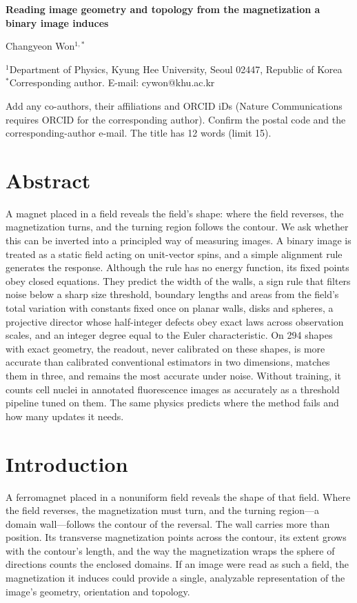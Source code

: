\documentclass[11pt,a4paper]{article}
\begin{document}
\begin{center}
{\LARGE\bfseries Reading image geometry and topology from the magnetization a binary image induces\par}
\vspace{1em}
{\large Changyeon Won$^{1,*}$\par}
\vspace{0.5em}
{\small $^1$Department of Physics, Kyung Hee University, Seoul 02447, Republic of Korea\\
$^*$Corresponding author. E-mail: cywon@khu.ac.kr\par}
\end{center}
\begin{authorbox}
Add any co-authors, their affiliations and ORCID iDs (Nature Communications requires ORCID for the corresponding author). Confirm the postal code and the corresponding-author e-mail. The title has 12 words (limit 15).
\end{authorbox}

\section*{Abstract}
A magnet placed in a field reveals the field's shape: where the field reverses, the magnetization turns, and the turning region follows the contour. We ask whether this can be inverted into a principled way of measuring images. A binary image is treated as a static field acting on unit-vector spins, and a simple alignment rule generates the response. Although the rule has no energy function, its fixed points obey closed equations. They predict the width of the walls, a sign rule that filters noise below a sharp size threshold, boundary lengths and areas from the field's total variation with constants fixed once on planar walls, disks and spheres, a projective director whose half-integer defects obey exact laws across observation scales, and an integer degree equal to the Euler characteristic. On 294 shapes with exact geometry, the readout, never calibrated on these shapes, is more accurate than calibrated conventional estimators in two dimensions, matches them in three, and remains the most accurate under noise. Without training, it counts cell nuclei in annotated fluorescence images as accurately as a threshold pipeline tuned on them. The same physics predicts where the method fails and how many updates it needs.

\section*{Introduction}
A ferromagnet placed in a nonuniform field reveals the shape of that field. Where the field reverses, the magnetization must turn, and the turning region---a domain wall---follows the contour of the reversal. The wall carries more than position. Its transverse magnetization points across the contour, its extent grows with the contour's length, and the way the magnetization wraps the sphere of directions counts the enclosed domains\cite{Mermin1979,Nagaosa2013}. If an image were read as such a field, the magnetization it induces could provide a single, analyzable representation of the image's geometry, orientation and topology.
\end{document}
